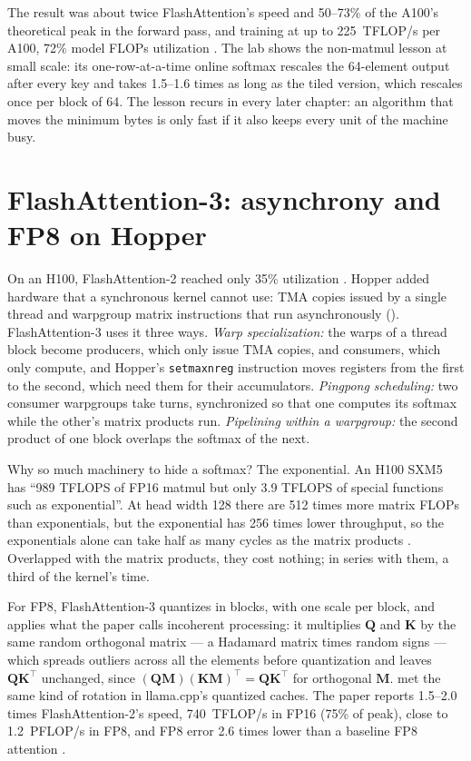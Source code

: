 The result was about twice FlashAttention's speed and 50--73\% of the A100's
theoretical peak in the forward pass, and training at up to 225~TFLOP/s per
A100, 72\% model FLOPs utilization \cite{dao2023flashattention2}. The lab shows
the non-matmul lesson at small scale: its one-row-at-a-time online softmax
rescales the 64-element output after every key and takes 1.5--1.6 times as long
as the tiled version, which rescales once per block of 64. The lesson recurs in
every later chapter: an algorithm that moves the minimum bytes is only fast if
it also keeps every unit of the machine busy.

\section{FlashAttention-3: asynchrony and FP8 on Hopper}

On an H100, FlashAttention-2 reached only 35\% utilization
\cite{shah2024flashattention3}. Hopper added hardware that a synchronous kernel
cannot use: TMA copies issued by a single thread and warpgroup matrix
instructions that run asynchronously ().
FlashAttention-3 uses it three ways. \emph{Warp specialization:} the warps of a
thread block become producers, which only issue TMA copies, and consumers,
which only compute, and Hopper's \texttt{setmaxnreg} instruction moves
registers from the first to the second, which need them for their
accumulators. \emph{Pingpong scheduling:} two consumer warpgroups take turns,
synchronized so that one computes its softmax while the other's matrix products
run. \emph{Pipelining within a warpgroup:} the second product of one block
overlaps the softmax of the next.

Why so much machinery to hide a softmax? The exponential. An H100 SXM5 has
``989 TFLOPS of FP16 matmul but only 3.9 TFLOPS of special functions such as
exponential''. At head width 128 there are 512 times more matrix FLOPs than
exponentials, but the exponential has 256 times lower throughput, so the
exponentials alone can take half as many cycles as the matrix products
\cite{shah2024flashattention3}. Overlapped with the matrix products, they cost
nothing; in series with them, a third of the kernel's time.

For FP8, FlashAttention-3 quantizes in blocks, with one scale per block, and
applies what the paper calls incoherent processing: it multiplies $\mathbf{Q}$
and $\mathbf{K}$ by the same random orthogonal matrix --- a Hadamard matrix
times random signs --- which spreads outliers across all the elements before
quantization and leaves $\mathbf{Q}\mathbf{K}^{\top}$ unchanged, since
$(\mathbf{Q}\mathbf{M})(\mathbf{K}\mathbf{M})^{\top} = \mathbf{Q}\mathbf{K}^{\top}$
for orthogonal $\mathbf{M}$.  met the same kind of rotation in
llama.cpp's quantized caches. The paper reports 1.5--2.0 times FlashAttention-2's
speed, 740~TFLOP/s in FP16 (75\% of peak), close to 1.2~PFLOP/s in FP8, and FP8
error 2.6 times lower than a baseline FP8 attention
\cite{shah2024flashattention3}.

